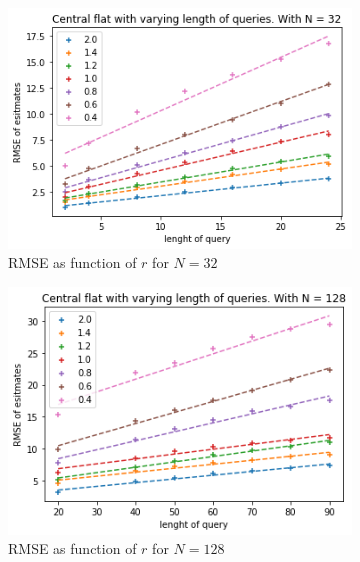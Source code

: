 \documentclass[11pt]{article}
\theoremstyle{definition}
\begin{document}
\begin{figure}[H]
\centering
\begin{subfigure}{.4\textwidth}
  \centering
  \includegraphics[width=\linewidth]{figures/central_flat/varying_r/cen_flat_varying_length_N_linear_=32.png}
  \caption{RMSE as function of $r$ for $N=32$}
  \label{fig:a}
\end{subfigure}%
\begin{subfigure}{.4\textwidth}
  \centering
  \includegraphics[width=\linewidth]{figures/central_flat/varying_r/cen_flat_varying_length_N_linear_=128.png}
  \caption{RMSE as function of $r$ for $N=128$}
  \label{fig:a}
\end{subfigure}
\begin{subfigure}{.4\textwidth}
  \centering

\end{subfigure}
\end{figure}
\end{document}
